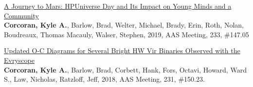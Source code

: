 \documentclass[letterpaper,12pt]{article}
\begin{document}
\begin{etaremune}
\item \href{https://ui.adsabs.harvard.edu/abs/2019AAS...23314705C/abstract}{\textcolor{rotundaorange}{A Journey to Mars: HPUniverse Day and Its Impact on Young Minds and a Community}}\\
\textbf{Corcoran, Kyle A.}, Barlow, Brad, Welter, Michael, Brady, Erin, Roth, Nolan, Boudreaux, Thomas Macauly,
Walser, Stephen, 2019, AAS Meeting, 233, \#147.05
\item \href{https://ui.adsabs.harvard.edu/abs/2018AAS...23115023C/abstract}{\textcolor{rotundaorange}{Updated O-C Diagrams for Several Bright HW Vir Binaries Observed with the Evryscope}}\\
\textbf{Corcoran, Kyle A.}, Barlow, Brad, Corbett, Hank, Fors, Octavi, Howard, Ward S., Law, Nicholas, Ratzloff, Jeff, 2018,
AAS Meeting, 231, \#150.23.
\end{etaremune}

\end{document}
